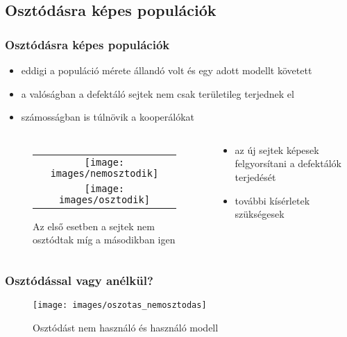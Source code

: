 \subsection{Osztódásra képes populációk}
\begin{frame}
	\frametitle{Osztódásra képes populációk}
	\begin{itemize}
		\item eddigi a populáció mérete állandó volt és egy adott modellt követett
		\item a valóságban a defektáló sejtek nem csak területileg terjednek el
		\item számosságban is túlnövik a kooperálókat
	\end{itemize}
	
	\begin{columns}
			\begin{figure}[ht]
				\centering
				\begin{tabular}{c}
					\texttt{[image: images/nemosztodik]}
					\\
					\texttt{[image: images/osztodik]}
				\end{tabular}
				\caption{Az első esetben a sejtek nem osztódtak míg a másodikban igen}				
				\label{fig:Divide}
			\end{figure}
			\begin{block}{}
				\begin{itemize}
					\item az új sejtek képesek felgyorsítani a defektálók terjedését
					\item további kísérletek szükségesek
				\end{itemize}
			\end{block}
	\end{columns}
\end{frame}

\begin{frame}
	\frametitle{Osztódással vagy anélkül?}
	\begin{figure}
		\centering
		\texttt{[image: images/oszotas\_nemosztodas]}
		\caption{Osztódást nem használó és használó modell}
	\end{figure}
\end{frame}
